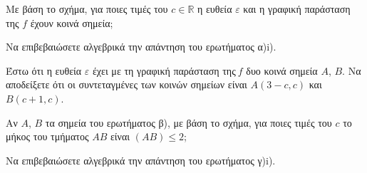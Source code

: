 \begin{alist}
\item
\begin{rlist}
\item 
  Με βάση το σχήμα, για ποιες τιμές του $c\mathbb{\in R}$ η ευθεία $\varepsilon$ και η γραφική παράσταση της $f$ έχουν κοινά σημεία;
\item
  Να επιβεβαιώσετε αλγεβρικά την απάντηση του ερωτήματος α)i).
\end{rlist}
\item Έστω ότι η ευθεία $\varepsilon$ έχει με τη γραφική παράσταση της$\ f$ δυο κοινά σημεία $A$, $B$. Να αποδείξετε ότι οι συντεταγμένες των κοινών σημείων είναι $A(3 - c,c)$ και $B(c + 1,c)$.
\item \begin{rlist}
\item
  Αν $A$, $B$ τα σημεία του ερωτήματος β), με βάση το σχήμα, για ποιες τιμές του $c$ το μήκος του τμήματος $AB$ είναι $(AB) \leq 2$;
\item
  Να επιβεβαιώσετε αλγεβρικά την απάντηση του ερωτήματος γ)i).
\end{rlist}
\end{alist}

